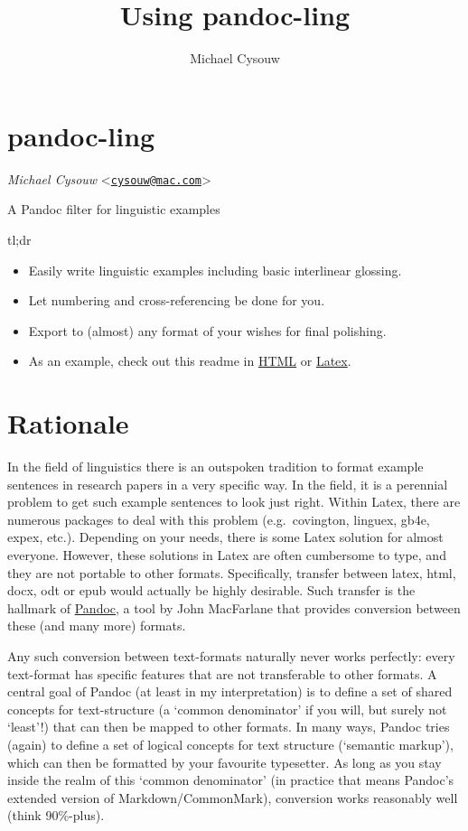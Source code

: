 \documentclass[
]{article}
\title{Using pandoc-ling}
\author{Michael Cysouw}
\date{}
\providecommand{\tightlist}{%
  \setlength{\itemsep}{0pt}\setlength{\parskip}{0pt}}
\begin{document}
\maketitle

{
\setcounter{tocdepth}{3}
\tableofcontents
}
\section{pandoc-ling}\label{pandoc-ling}

\emph{Michael Cysouw}
\textless{}\href{mailto:cysouw@mac.com}{\nolinkurl{cysouw@mac.com}}\textgreater{}

A Pandoc filter for linguistic examples

tl;dr

\begin{itemize}
\tightlist
\item
  Easily write linguistic examples including basic interlinear glossing.
\item
  Let numbering and cross-referencing be done for you.
\item
  Export to (almost) any format of your wishes for final polishing.
\item
  As an example, check out this readme in
  \href{https://cysouw.github.io/pandoc-ling/readme.html}{HTML} or
  \href{https://cysouw.github.io/pandoc-ling/readme_gb4e.pdf}{Latex}.
\end{itemize}

\section{Rationale}\label{rationale}

In the field of linguistics there is an outspoken tradition to format
example sentences in research papers in a very specific way. In the
field, it is a perennial problem to get such example sentences to look
just right. Within Latex, there are numerous packages to deal with this
problem (e.g.~covington, linguex, gb4e, expex, etc.). Depending on your
needs, there is some Latex solution for almost everyone. However, these
solutions in Latex are often cumbersome to type, and they are not
portable to other formats. Specifically, transfer between latex, html,
docx, odt or epub would actually be highly desirable. Such transfer is
the hallmark of \href{https://pandoc.org}{Pandoc}, a tool by John
MacFarlane that provides conversion between these (and many more)
formats.

Any such conversion between text-formats naturally never works
perfectly: every text-format has specific features that are not
transferable to other formats. A central goal of Pandoc (at least in my
interpretation) is to define a set of shared concepts for text-structure
(a `common denominator' if you will, but surely not `least'!) that can
then be mapped to other formats. In many ways, Pandoc tries (again) to
define a set of logical concepts for text structure (`semantic markup'),
which can then be formatted by your favourite typesetter. As long as you
stay inside the realm of this `common denominator' (in practice that
means Pandoc's extended version of Markdown/CommonMark), conversion
works reasonably well (think 90\%-plus).
\end{document}
